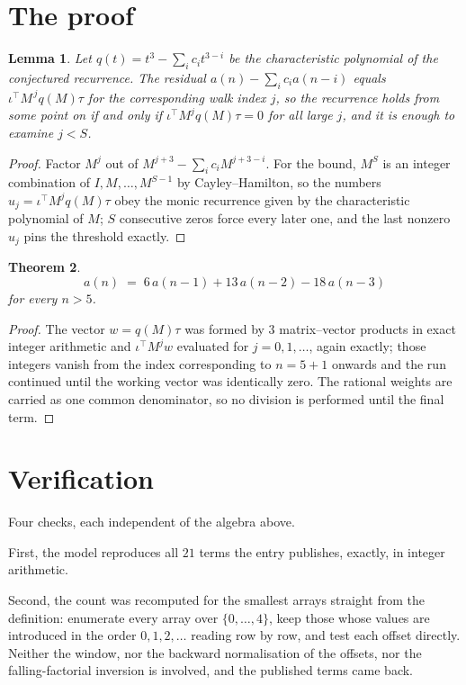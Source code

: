 \documentclass[11pt,a4paper]{article}
\theoremstyle{plain}
\newtheorem{theorem}{Theorem}
\newtheorem{lemma}[theorem]{Lemma}
\theoremstyle{definition}
\begin{document}
\section{The proof}

\begin{lemma}\label{lem:crit}
Let $q(t)=t^{3}-\sum_i c_it^{3-i}$ be the characteristic polynomial of the
conjectured recurrence. The residual $a(n)-\sum_ic_ia(n-i)$ equals
$\iota^{\!\top}M^{\,j}q(M)\tau$ for the corresponding walk index $j$, so the recurrence
holds from some point on if and only if $\iota^{\!\top}M^{j}q(M)\tau=0$ for all large $j$,
and it is enough to examine $j<S$.
\end{lemma}

\begin{proof}
Factor $M^{j}$ out of $M^{j+3}-\sum_ic_iM^{j+3-i}$. For the bound, $M^{S}$
is an integer combination of $I,M,\dots,M^{S-1}$ by Cayley--Hamilton, so the numbers
$u_j=\iota^{\!\top}M^{j}q(M)\tau$ obey the monic recurrence given by the characteristic
polynomial of $M$; $S$ consecutive zeros force every later one, and the last nonzero $u_j$
pins the threshold exactly.
\end{proof}

\begin{theorem}
\[
a(n)\;=\;6\,a(n-1) + 13\,a(n-2) - 18\,a(n-3)
\]
for every $n>5$.
\end{theorem}

\begin{proof}
The vector $w=q(M)\tau$ was formed by $3$ matrix--vector products in exact integer
arithmetic and $\iota^{\!\top}M^{j}w$ evaluated for $j=0,1,\dots$, again exactly; those
integers vanish from the index corresponding to $n=5+1$ onwards and the run continued
until the working vector was identically zero. The rational weights are carried as one common
denominator, so no division is performed until the final term.
\end{proof}

\section{Verification}

Four checks, each independent of the algebra above.

First, the model reproduces all $21$ terms the entry publishes, exactly, in integer
arithmetic.

Second, the count was recomputed for the smallest arrays straight from the definition:
enumerate every array over $\{0,\dots,4\}$, keep those whose values are introduced in the
order $0,1,2,\dots$ reading row by row, and test each offset directly. Neither the window, nor
the backward normalisation of the offsets, nor the falling-factorial inversion is involved, and
the published terms came back.
\end{document}
